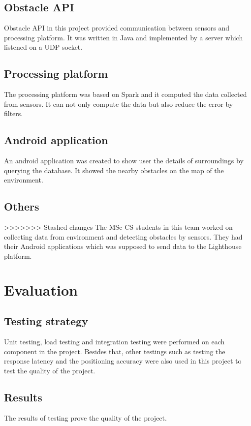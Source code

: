 \documentclass[prodmode,acmtosem]{acmsmall} %
\begin{document}
\subsection{Obstacle API}
Obstacle API in this project provided communication between sensors and processing platform. It was written in Java and implemented by a server which listened on a UDP socket.
\subsection{Processing platform}
The processing platform was based on Spark and it computed the data collected from sensors. It can not only compute the data but also reduce the error by filters.
\subsection{Android application}
An android application was created to show user the details of surroundings by querying the database. It showed the nearby obstacles on the map of the environment.
\subsection{Others}
>>>>>>> Stashed changes
The MSc CS students in this team worked on collecting data from environment and detecting obstacles by sensors. They had their Android applications which was supposed to send data to the Lighthouse platform.
\section{Evaluation}
\subsection{Testing strategy}
Unit testing, load testing and integration testing were performed on each component in the project. Besides that, other testings such as testing the response latency and the positioning accuracy were also used in this project to test the quality of the project.
\subsection{Results}
The results of testing prove the quality of the project. 
\end{document}
